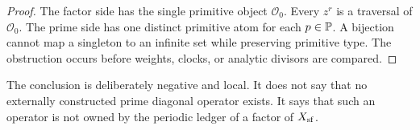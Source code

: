 \begin{proof}
The factor side has the single primitive object \(\mathcal O_0\).  Every
\(z^r\) is a traversal of \(\mathcal O_0\).  The prime side has one distinct
primitive atom for each \(p\in\mathbb P\).  A bijection cannot map a singleton to
an infinite set while preserving primitive type.  The obstruction occurs
before weights, clocks, or analytic divisors are compared.
\end{proof}

The conclusion is deliberately negative and local.  It does not say that no
externally constructed prime diagonal operator exists.  It says that such an
operator is not owned by the periodic ledger of a factor of \(X_{\mathrm{sf}}\).
